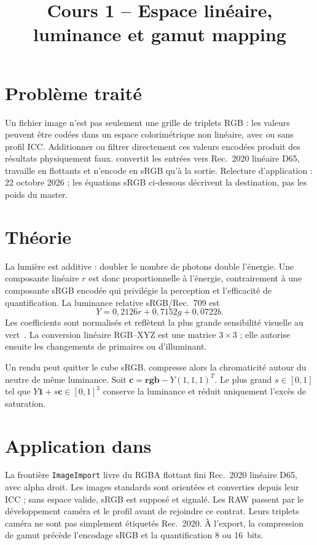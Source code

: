
\title{Cours 1 -- Espace linéaire, luminance et gamut mapping}


\section{Problème traité}
Un fichier image n'est pas seulement une grille de triplets RGB : les valeurs peuvent être codées dans un espace colorimétrique non linéaire, avec ou sans profil ICC. Additionner ou filtrer directement ces valeurs encodées produit des résultats physiquement faux. \IPR{} convertit les entrées vers Rec.~2020 linéaire D65, travaille en flottants et n'encode en sRGB qu'à la sortie. Relecture d'application : 22 octobre 2026 ; les équations sRGB ci-dessous décrivent la destination, pas les poids du master.

\section{Théorie}
La lumière est additive : doubler le nombre de photons double l'énergie. Une composante linéaire $r$ est donc proportionnelle à l'énergie, contrairement à une composante sRGB encodée qui privilégie la perception et l'efficacité de quantification. La luminance relative sRGB/Rec.~709 est
\begin{equation}
Y=0{,}2126r+0{,}7152g+0{,}0722b.
\end{equation}
Les coefficients sont normalisés et reflètent la plus grande sensibilité visuelle au vert~\cite{srgb,icc2022}. La conversion linéaire RGB--XYZ est une matrice $3\times3$ ; elle autorise ensuite les changements de primaires ou d'illuminant.

Un rendu peut quitter le cube sRGB. \IPR{} compresse alors la chromaticité autour du neutre de même luminance. Soit $\mathbf{c}=\mathbf{rgb}-Y(1,1,1)^T$. Le plus grand $s\in[0,1]$ tel que $Y\mathbf{1}+s\mathbf{c}\in[0,1]^3$ conserve la luminance et réduit uniquement l'excès de saturation.

\section{Application dans \IPR{}}
La frontière \texttt{ImageImport} livre du RGBA flottant fini Rec.~2020 linéaire D65, avec alpha droit. Les images standards sont orientées et converties depuis leur ICC ; sans espace valide, sRGB est supposé et signalé. Les RAW passent par le développement caméra et le profil avant de rejoindre ce contrat. Leurs triplets caméra ne sont pas simplement étiquetés Rec.~2020. À l'export, la compression de gamut précède l'encodage sRGB et la quantification 8 ou 16~bits.

